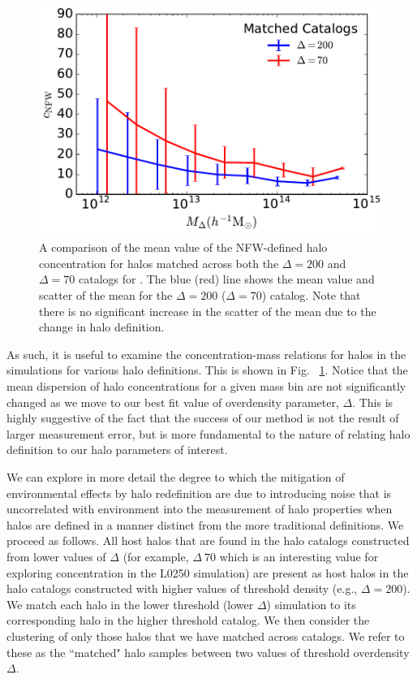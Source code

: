 \documentclass[usenatbib]{mnras}
\begin{document}
\begin{figure}
	\centering
	\includegraphics[width=.4\textwidth]{matched_catalog_cnfwcomp.pdf}
	\caption{A comparison of the mean value of the NFW-defined halo concentration for halos matched across both
	the $\Delta = 200$ and $\Delta = 70$ catalogs for \simB. The blue (red) line shows the mean value and scatter of
	the	mean for the $\Delta = 200$ ($\Delta = 70$) catalog. Note that there is no significant
	increase in the scatter of the mean due to the change in halo definition.}
	\label{fig:matched_cnfwcomp}
\end{figure}

As such, it is useful to examine the concentration-mass relations for halos in 
the simulations for various halo definitions. This is shown in Fig. ~\ref{fig:matched_cnfwcomp}. 
Notice that the mean dispersion of halo concentrations for a given mass
bin are not significantly changed as we move to our best fit value of
overdensity parameter, $\Delta$. This is highly suggestive of the fact
that the success of our method is not the result of larger measurement
error, but is more fundamental to the nature of relating halo definition to
our halo parameters of interest.

We can explore in more detail the degree to which the mitigation of environmental 
effects by halo redefinition are due to introducing noise that is uncorrelated with 
environment into the measurement of halo properties when halos are defined 
in a manner distinct from the more traditional definitions. We proceed as follows. 
All host halos that are found in the halo catalogs constructed from lower values 
of $\Delta$ (for example, $\Delta ~ 70$ which is an interesting value for exploring 
concentration in the L0250 simulation) are present as host halos in the halo 
catalogs constructed with higher values of threshold density (e.g., $\Delta = 200$). 
We match each halo in the lower threshold (lower $\Delta$) simulation to 
its corresponding halo in the higher threshold catalog. We then consider 
the clustering of only those halos that we have matched across catalogs. 
We refer to these as the ``matched" halo samples between two values 
of threshold overdensity $\Delta$. 
\end{document}
